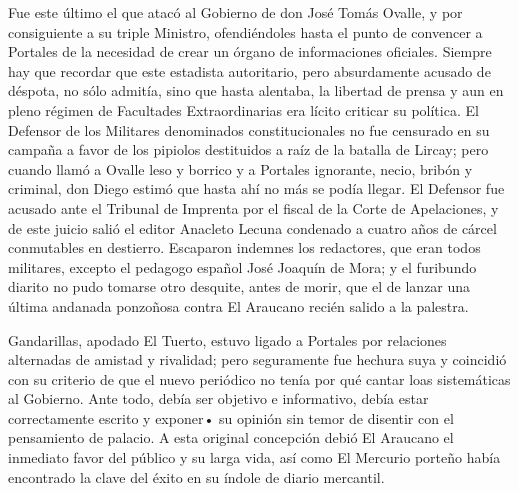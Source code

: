 \documentclass[10pt,twoside,openright]{memoir}
\begin{document}
Fue
este último el que atacó al Gobierno de don José Tomás Ovalle, y por
consiguiente a su triple Ministro, ofendiéndoles hasta el punto de
convencer a Portales de la necesidad de crear un órgano de informaciones
oficiales. Siempre hay que recordar que este estadista autoritario, pero
absurdamente acusado de déspota, no sólo admitía, sino que hasta
alentaba, la libertad de prensa y aun en pleno régimen de Facultades
Extraordinarias era lícito criticar su política. El Defensor de los
Militares denominados constitucionales no fue censurado en su campaña a
favor de los pipiolos destituidos a raíz de la batalla de Lircay; pero
cuando llamó a Ovalle leso y borrico y a Portales ignorante, necio,
bribón y criminal, don Diego estimó
que hasta ahí no más se podía llegar. El Defensor fue acusado ante el
Tribunal de Imprenta por el fiscal de la Corte de Apelaciones, y de este
juicio salió el editor Anacleto Lecuna condenado a cuatro años de cárcel
conmutables en destierro. Escaparon indemnes los redactores, que eran
todos militares, excepto el pedagogo español José Joaquín de Mora; y el
furibundo diarito no pudo tomarse otro desquite, antes de morir, que el
de lanzar una última andanada ponzoñosa contra El Araucano recién salido
a la palestra.

Gandarillas,
apodado El Tuerto, estuvo ligado a Portales por relaciones alternadas de
amistad y rivalidad; pero seguramente fue hechura suya y coincidió con
su criterio de que el nuevo periódico no tenía por qué cantar loas
sistemáticas al Gobierno. Ante todo, debía ser objetivo e informativo,
debía estar correctamente escrito y
exponer• su opinión sin temor de disentir con el pensamiento de palacio.
A esta original concepción debió El Araucano el inmediato favor del
público y su larga vida, así como El Mercurio porteño había encontrado
la clave del éxito en su índole de diario mercantil.
\end{document}
